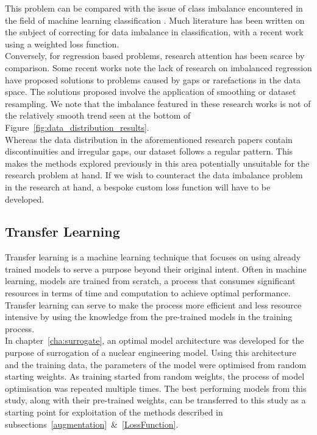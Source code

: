 \noindent
This problem can be compared with the issue of class imbalance encountered in the field of machine learning classification \cite{johnson2019survey}. Much literature has been written on the subject of correcting for data imbalance in classification, with a recent work \cite{sarullo2019class} using a weighted loss function. 
\\

\noindent
Conversely, for regression based problems, research attention has been scarce by comparison. Some recent works \cite{branco2017smogn}\cite{yang2021delving} note the lack of research on imbalanced regression have proposed solutions to problems caused by gaps or rarefactions in the data space. The solutions proposed involve the application of smoothing or dataset resampling. We note that the imbalance featured in these research works is not of the relatively smooth trend seen at the bottom of Figure~\ref{fig:data_distribution_results}.  
\\

\noindent
Whereas the data distribution in the aforementioned research papers contain discontinuities and irregular gaps, our dataset follows a regular pattern. This makes the methods explored previously in this area potentially unsuitable for the research problem at hand. If we wish to counteract the data imbalance problem in the research at hand, a bespoke custom loss function will have to be developed.


\subsection{Transfer Learning} \label{TransferLearning}

Transfer learning is a machine learning technique that focuses on using already trained models to serve a purpose beyond their original intent. Often in machine learning, models are trained from scratch, a process that consumes significant resources in terms of time and computation to achieve optimal performance. Transfer learning can serve to make the process more efficient and less resource intensive by using the knowledge from the pre-trained models in the training process.
\\

\noindent
In chapter~\ref{cha:surrogate}, an optimal model architecture was developed for the purpose of surrogation of a nuclear engineering model. Using this architecture and the training data, the parameters of the model were optimised from random starting weights. As training started from random weights, the process of model optimisation was repeated multiple times. The best performing models from this study, along with their pre-trained weights, can be transferred to this study as a starting point for exploitation of the methods described in subsections~\ref{augmentation}~\&~\ref{LossFunction}. 

